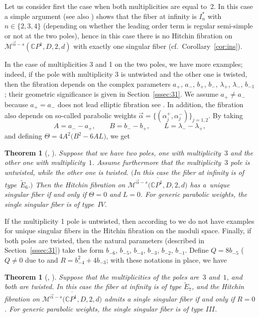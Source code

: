 \documentclass[10pt,a4paper]{amsart}
\newcommand{\CP}[1]{\mathbb{C}P^{#1}} %
\newcommand{\Et}[1]{\widetilde{E}_{#1}} %
\newcommand{\Mod}{{\mathcal M}} %
\numberwithin{equation}{section}
\newtheorem{thm}[prop]{Theorem}
\begin{document}
Let us consider first the case when both multiplicities are equal to~2. In this case a simple argument (see also
\cite[Theorems~{2.1,~2.2,~2.3}]{ISS2}) shows that the fiber at infinity
is $I_n^*$ with $n\in \{2,3,4\}$ (depending on whether the leading
order term is regular semi-simple or not at the two poles), hence in
this case there is no Hitchin fibration on $\Mod ^{\vec{\alpha}-s}{(\CP1, D, 2, d)}$ with exactly one
singular fiber (cf.\ Corollary~\ref{cor:ins}).

In the case of multiplicities 3 and 1 on the two poles, we have more
examples; indeed, if the pole with multiplicity 3 is
untwisted and the other one is twisted, then the fibration
depends on the complex parameters
$a_+$, $a_-$, $b_+$, $b_-$, $\lambda_+$, $\lambda_-$, $b_{-1}$;
their geometric significance is given in Section~\ref{sssec:31}.
{We assume $a_+\neq a_-$ because $a_+= a_-$ does not lead elliptic fibration see \cite[Remark~6.7]{ISS2}.}
{In addition, the fibration also depends on so-called parabolic
weights $\vec{\alpha} = \{ (\alpha_j^+, \alpha_j^-) \}_{j=1,2}$.}
By taking
\[
A=a_--a_+,\qquad B=b_--b_+,\qquad L=\lambda_--\lambda_+,
\]
and defining ${\Theta} = 4 A^2 \big(B^2-6 A L\big)$, we get

\begin{thm}[{\cite[Theorem~{2.5}]{ISS2}, \cite[Lemma~2]{Sz_PW}}]\label{thm:TwoPolesUT}
Suppose that we have two poles, one with multiplicity~$3$ and the other
one with multiplicity~$1$. Assume furthermore that the multiplicity~$3$
pole is untwisted, while the other one is twisted. $($In this case the
fiber at infinity is of type~$\Et6.)$ Then the Hitchin fibration
on $\overline{\Mod^{\vec{\alpha}-s} \big(\CP1, D, 2, d\big)}$ has
a~unique singular fiber if and only if ${\Theta} =0$ and $L=0$.
For generic parabolic weights, the single singular fiber is of type~$IV$.
\end{thm}

If the multiplicity 1 pole is untwisted, then according to
\cite[Theorems~{2.4,~2.6}]{ISS2} we do not have examples for unique
singular fibers in the Hitchin fibration on the moduli space.
Finally, if both poles are twisted, then
the natural parameters (described in Section~\ref{sssec:31})
take the form
$b_{-6}$, $b_{-5}$, $b_{-4}$, $b_{-3}$, $b_{-2}$, $b_{-1}$.
Define $Q=8b_{-5}$ ({$Q\neq 0$ due to \cite[Lemma~6.8]{ISS2}} and $R=b_{-4}^2+4 b_{-3}$;
with these notations in place, we have
\begin{thm}[{\cite[Theorem~{2.7}]{ISS2}, \cite[Lemma~2]{Sz_PW}}]\label{thm:TwoPolesTT}
Suppose that the multiplicities of the poles are~$3$ and~$1$, and both
are twisted. In this case the fiber at infinity is of type
$\Et7$, and the Hitchin fibration on $\overline{\Mod^{\vec{\alpha}-s} \big(\CP1, D, 2, d\big)}$
admits a single singular fiber if and only if $R=0$.
{For generic parabolic weights}, the single singular fiber is of type $III$.
\end{thm}
\end{document}
